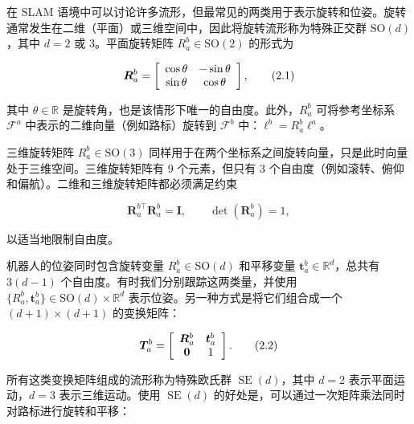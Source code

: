 在 SLAM 语境中可以讨论许多流形，但最常见的两类用于表示旋转和位姿。旋转通常发生在二维（平面）或三维空间中，因此将旋转流形称为特殊正交群 $\mathrm{SO}(d)$，其中 $d=2$ 或 $3$。平面旋转矩阵 $R_a^b\in\mathrm{SO}(2)$ 的形式为

\begin{equation}
\boldsymbol {R} _ {a} ^ {b} = \left[ \begin{array}{c c} \cos \theta & - \sin \theta \\ \sin \theta & \cos \theta \end{array} \right],\tag{2.1}
\end{equation}

其中 $\theta\in\mathbb{R}$ 是旋转角，也是该情形下唯一的自由度。此外，$R_a^b$ 可将参考坐标系 $\mathcal{F}^a$ 中表示的二维向量（例如路标）旋转到 $\mathcal{F}^b$ 中：$\ell^b=R_a^b\ell^a$。

三维旋转矩阵 $R_a^b\in\mathrm{SO}(3)$ 同样用于在两个坐标系之间旋转向量，只是此时向量处于三维空间。三维旋转矩阵有 9 个元素，但只有 3 个自由度（例如滚转、俯仰和偏航）。二维和三维旋转矩阵都必须满足约束

\begin{equation*}
\pmb { R } _ { a } ^ { b \top } \pmb { R } _ { a } ^ { b } = \mathbf { I }, \qquad \det (\boldsymbol {R} _ {a} ^ {b})=1,
\end{equation*}

以适当地限制自由度。

机器人的位姿同时包含旋转变量 $R_a^b\in\mathrm{SO}(d)$ 和平移变量 $\pmb t_a^b\in\mathbb{R}^d$，总共有 $3(d-1)$ 个自由度。有时我们分别跟踪这两类量，并使用 $\{R_a^b,\pmb t_a^b\}\in\mathrm{SO}(d)\times\mathbb{R}^d$ 表示位姿。另一种方式是将它们组合成一个 $(d+1)\times(d+1)$ 的变换矩阵：

\begin{equation}
\boldsymbol {T} _ {a} ^ {b} = \left[ \begin{array}{c c} \boldsymbol {R} _ {a} ^ {b} & \boldsymbol {t} _ {a} ^ {b} \\ \boldsymbol {0} & 1 \end{array} \right].\tag{2.2}
\end{equation}

所有这类变换矩阵组成的流形称为特殊欧氏群 $\operatorname{SE}(d)$，其中 $d=2$ 表示平面运动，$d=3$ 表示三维运动。使用 $\operatorname{SE}(d)$ 的好处是，可以通过一次矩阵乘法同时对路标进行旋转和平移：

